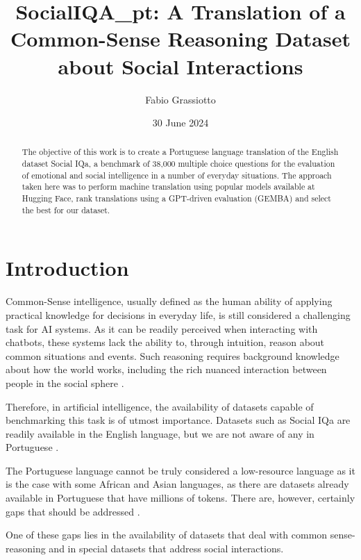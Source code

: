 \documentclass{article}
\title{SocialIQA\_pt: A Translation of a Common-Sense Reasoning Dataset about Social Interactions}
\author{Fabio Grassiotto}
\date{30 June 2024}
\begin{document}
\maketitle

\begin{abstract}
    The objective of this work is to create a Portuguese language translation of
    the English dataset Social IQa, a benchmark of 38,000 multiple choice
    questions for the evaluation of emotional and social intelligence in a
    number of everyday situations. The approach taken here was to perform
    machine translation using popular models available at Hugging Face, rank
    translations using a GPT-driven evaluation (GEMBA) and select the best for
    our dataset.
\end{abstract}

\section{Introduction}

Common-Sense intelligence, usually defined as the human ability of applying
practical knowledge for decisions in everyday life, is still considered a
challenging task for AI systems. As it can be readily perceived when interacting
with chatbots, these systems lack the ability to, through intuition, reason
about common situations and events. Such reasoning requires background knowledge
about how the world works, including the rich nuanced interaction between people
in the social sphere \cite{choi2022curious, krause2023commonsense}.

Therefore, in artificial intelligence, the availability of datasets capable of
benchmarking this task is of utmost importance. Datasets such as Social IQa are
readily available in the English language, but we are not aware of any in
Portuguese \cite{sap2019socialiqa}.

The Portuguese language cannot be truly considered a low-resource language as
it is the case with some African and Asian languages, as there are
datasets already available in Portuguese that have millions of tokens. There
are, however, certainly gaps that should be addressed \cite{ghafoor2021impact}.

One of these gaps lies in the availability of datasets that deal with common
sense-reasoning and in special datasets that address social interactions.
\end{document}
